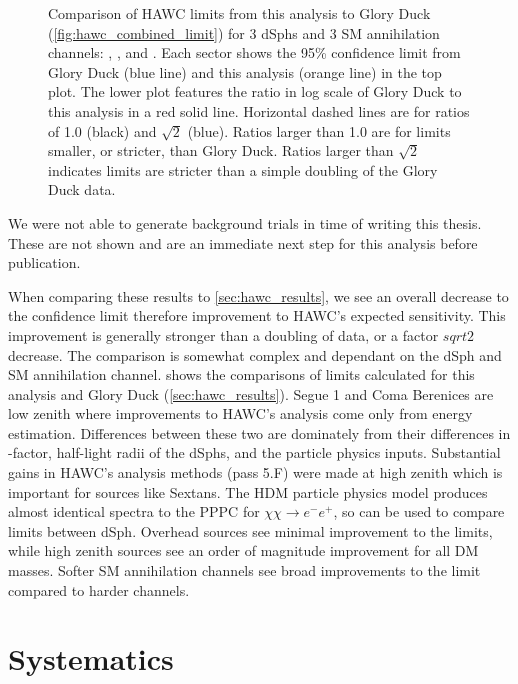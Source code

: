 \begin{figure}[h]
{\begin{tabular}{cccc}
    \end{tabular}
    }
    \caption{Comparison of HAWC limits from this analysis to Glory Duck (\cref{fig:hawc_combined_limit}) for 3 dSphs and 3 SM annihilation channels: , \parpar{\tau}, and . Each sector shows the 95\% confidence limit from Glory Duck (blue line) and this analysis (orange line) in the top plot. The lower plot features the ratio in log scale of Glory Duck to this analysis in a red solid line. Horizontal dashed lines are for ratios of 1.0 (black) and $\sqrt{2}$ (blue). Ratios larger than 1.0 are for limits smaller, or stricter, than Glory Duck. Ratios larger than $\sqrt{2}$ indicates limits are stricter than a simple doubling of the Glory Duck data.}
\label{fig:mtd_compare2gd}
\end{figure}

We were not able to generate background trials in time of writing this thesis.
These are not shown and are an immediate next step for this analysis before publication.

When comparing these results to \cref{sec:hawc_results}, we see an overall decrease to the confidence limit therefore improvement to HAWC's expected sensitivity.
This improvement is generally stronger than a doubling of data, or a factor $sqrt{2}$ decrease.
The comparison is somewhat complex and dependant on the dSph and SM annihilation channel.
 shows the comparisons of limits calculated for this analysis and Glory Duck (\cref{sec:hawc_results}).
Segue 1 and Coma Berenices are low zenith where improvements to HAWC's analysis come only from energy estimation.
Differences between these two are dominately from their differences in \J-factor, half-light radii of the dSphs, and the particle physics inputs.
Substantial gains in HAWC's analysis methods (pass 5.F) were made at high zenith which is important for sources like Sextans.
The HDM particle physics model produces almost identical spectra to the PPPC for $\chi\chi \rightarrow e^-e^+$, so can be used to compare limits between dSph.
Overhead sources see minimal improvement to the limits, while high zenith sources see an order of magnitude improvement for all DM masses.
Softer SM annihilation channels see broad improvements to the limit compared to harder channels.


\section{Systematics}\label{sec:mtd_systemaics}

